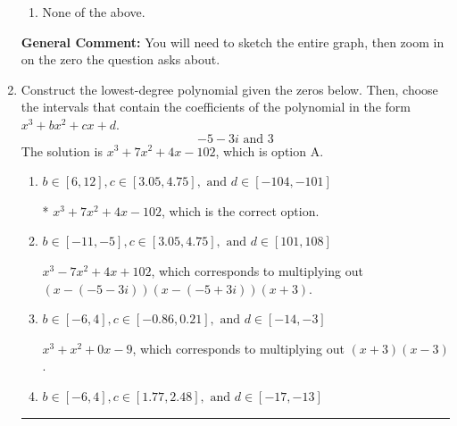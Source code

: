 \documentclass{extbook}[14pt]
\newcommand{\litem}[1]{\item #1

\rule{\textwidth}{0.4pt}}
\begin{document}
\begin{enumerate}
{\begin{enumerate}[label=\Alph*.]
\item None of the above.\end{enumerate}
\textbf{General Comment:} You will need to sketch the entire graph, then zoom in on the zero the question asks about.
}
\litem{
Construct the lowest-degree polynomial given the zeros below. Then, choose the intervals that contain the coefficients of the polynomial in the form $x^3+bx^2+cx+d$.
\[ -5 - 3 i \text{ and } 3 \]The solution is \( x^{3} +7 x^{2} +4 x -102 \), which is option A.\begin{enumerate}[label=\Alph*.]
\item \( b \in [6, 12], c \in [3.05, 4.75], \text{ and } d \in [-104, -101] \)

* $x^{3} +7 x^{2} +4 x -102$, which is the correct option.
\item \( b \in [-11, -5], c \in [3.05, 4.75], \text{ and } d \in [101, 108] \)

$x^{3} -7 x^{2} +4 x + 102$, which corresponds to multiplying out $(x-(-5 - 3 i))(x-(-5 + 3 i))(x + 3)$.
\item \( b \in [-6, 4], c \in [-0.86, 0.21], \text{ and } d \in [-14, -3] \)

$x^{3} + x^{2} +0 x -9$, which corresponds to multiplying out $(x + 3)(x -3)$.
\item \( b \in [-6, 4], c \in [1.77, 2.48], \text{ and } d \in [-17, -13] \)


\end{enumerate}}
\end{enumerate}
\end{document}
